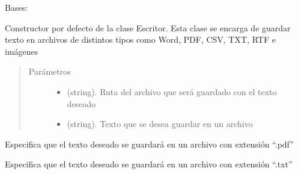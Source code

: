 \documentclass[letterpaper,10pt,openany,spanish]{sphinxmanual}
\begin{document}
\begin{fulllineitems}
\label{\detokenize{funciones/escritura:escritura.Escritor}}
Bases: 

Constructor por defecto de la clase Escritor. Esta clase se encarga de guardar             texto en archivos de distintos tipos como Word, PDF, CSV, TXT, RTF e             imágenes
\begin{quote}\begin{description}
\item[{Parámetros}] \leavevmode\begin{itemize}
\item {} 
 \textendash{} (string). Ruta del archivo que será guardado             con el texto deseado

\item {} 
 \textendash{} (string). Texto que se desea guardar en un archivo

\end{itemize}

\end{description}\end{quote}

\begin{fulllineitems}
\label{\detokenize{funciones/escritura:escritura.Escritor.escribir_pdf}}
Especifica que el texto deseado se guardará en un archivo con extensión “.pdf”

\end{fulllineitems}


\begin{fulllineitems}
\label{\detokenize{funciones/escritura:escritura.Escritor.escribir_txt}}
Especifica que el texto deseado se guardará en un archivo con extensión “.txt”


\end{fulllineitems}
\end{fulllineitems}
\end{document}
